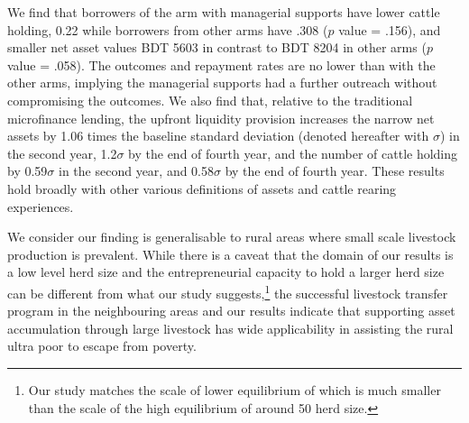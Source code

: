 	We find that borrowers of the arm with managerial supports have lower cattle holding, 0.22 while borrowers from other arms have .308 ($p$ value = .156), and smaller net asset values BDT 5603 in contrast to BDT 8204 in other arms ($p$ value = .058). The outcomes and repayment rates are no lower than with the other arms, implying the managerial supports had a further outreach without compromising the outcomes. We also find that, relative to the traditional microfinance lending, the upfront liquidity provision increases the narrow net assets by 
	1.06 times the baseline standard deviation (denoted hereafter with $\sigma$) in the second year, 
	1.2$\sigma$ by the end of fourth year, 
	and the number of cattle holding by 0.59$\sigma$ in the second year, and 
	0.58$\sigma$ by the end of fourth year. 
	These results hold broadly with other various definitions of assets and cattle rearing experiences.

	
	We consider our finding is generalisable to rural areas where small scale livestock production is prevalent. While there is a caveat that the domain of our results is a low level herd size and the entrepreneurial capacity to hold a larger herd size can be different from what our study suggests,\footnote{Our study matches the scale of lower equilibrium of \citet{Lybbertetal2004} which is much smaller than the scale of the high equilibrium of around 50 herd size. } the successful livestock transfer program in the neighbouring areas \citep{BandieraBRAC2017, Balboni2020} and our results indicate that supporting asset accumulation through large livestock has wide applicability in assisting the rural ultra poor to escape from poverty.


